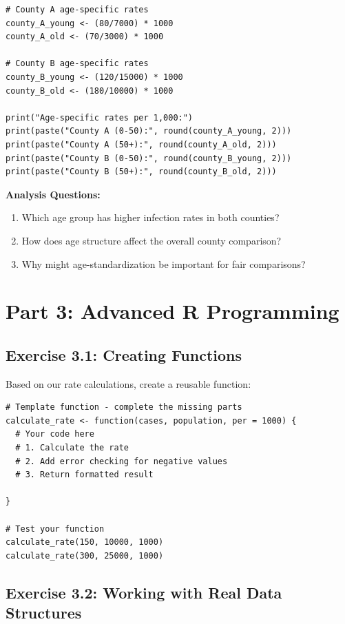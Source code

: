 \documentclass[11pt]{article}
\begin{document}
\begin{lstlisting}
# County A age-specific rates
county_A_young <- (80/7000) * 1000
county_A_old <- (70/3000) * 1000

# County B age-specific rates
county_B_young <- (120/15000) * 1000
county_B_old <- (180/10000) * 1000

print("Age-specific rates per 1,000:")
print(paste("County A (0-50):", round(county_A_young, 2)))
print(paste("County A (50+):", round(county_A_old, 2)))
print(paste("County B (0-50):", round(county_B_young, 2)))
print(paste("County B (50+):", round(county_B_old, 2)))
\end{lstlisting}

\textbf{Analysis Questions:}
\begin{enumerate}
\item Which age group has higher infection rates in both counties?
\item How does age structure affect the overall county comparison?
\item Why might age-standardization be important for fair comparisons?
\end{enumerate}

\section{Part 3: Advanced R Programming}

\subsection{Exercise 3.1: Creating Functions}

Based on our rate calculations, create a reusable function:

\begin{lstlisting}
# Template function - complete the missing parts
calculate_rate <- function(cases, population, per = 1000) {
  # Your code here
  # 1. Calculate the rate
  # 2. Add error checking for negative values
  # 3. Return formatted result

}

# Test your function
calculate_rate(150, 10000, 1000)
calculate_rate(300, 25000, 1000)
\end{lstlisting}

\subsection{Exercise 3.2: Working with Real Data Structures}
\end{document}
